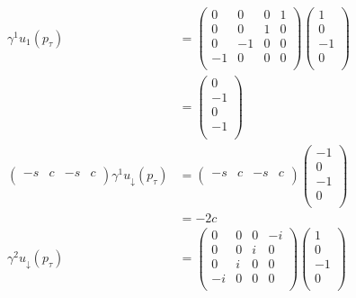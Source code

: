 \begin{align*}
    \gamma^1 u_1(p_\tau) &= \begin{pmatrix}
        0 & 0 & 0 & 1 \\
        0 & 0 & 1 & 0 \\
        0 & -1 & 0 & 0 \\
        -1 & 0 & 0 & 0 \\
    \end{pmatrix}\begin{pmatrix}
        1 \\ 0 \\ -1 \\ 0 \\
    \end{pmatrix}\\
    &= \begin{pmatrix}
        0 \\
        -1 \\
        0 \\
        -1 \\
    \end{pmatrix}\\
    \begin{pmatrix}
        -s & c & -s & c \\
    \end{pmatrix} \gamma^1 u_\downarrow(p_\tau) &= \begin{pmatrix}
        -s & c & -s & c \\
    \end{pmatrix}\begin{pmatrix}
        -1 \\
        0 \\
        -1 \\
        0 \\
    \end{pmatrix}\\
    &= -2c\\
    \gamma^2 u_\downarrow(p_\tau) &= \begin{pmatrix}
        0 & 0 & 0 & -i \\
        0 & 0 & i & 0 \\
        0 & i & 0 & 0 \\
        -i & 0 & 0 & 0 \\
    \end{pmatrix}\begin{pmatrix}
        1 \\ 0 \\ -1 \\ 0 \\

\end{pmatrix}
\end{align*}

